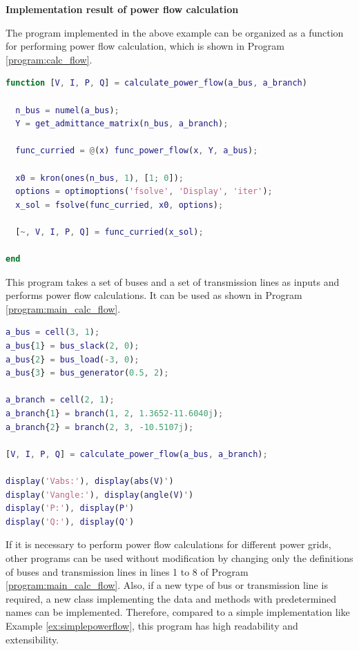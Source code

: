 \documentclass[graybox, envcountchap]{svmult}
\begin{document}
\begin{example}{\textbf{Implementation result of power flow calculation}}

The program implemented in the above example can be organized as a function for
performing power flow calculation, which is shown in Program
\ref{program:calc_flow}.

\begin{lstlisting}[language=Matlab, caption=calculate\_power\_flow.m, label={program:calc_flow}]
function [V, I, P, Q] = calculate_power_flow(a_bus, a_branch)

  n_bus = numel(a_bus);
  Y = get_admittance_matrix(n_bus, a_branch);

  func_curried = @(x) func_power_flow(x, Y, a_bus);

  x0 = kron(ones(n_bus, 1), [1; 0]);
  options = optimoptions('fsolve', 'Display', 'iter');
  x_sol = fsolve(func_curried, x0, options);

  [~, V, I, P, Q] = func_curried(x_sol);

end
\end{lstlisting}

This program takes a set of buses and a set of transmission lines as inputs and
performs power flow calculations. It can be used as shown in Program
\ref{program:main_calc_flow}.

\begin{lstlisting}[language=Matlab, caption=main\_power\_flow.m, label={program:main_calc_flow}]
a_bus = cell(3, 1);
a_bus{1} = bus_slack(2, 0);
a_bus{2} = bus_load(-3, 0);
a_bus{3} = bus_generator(0.5, 2);

a_branch = cell(2, 1);
a_branch{1} = branch(1, 2, 1.3652-11.6040j);
a_branch{2} = branch(2, 3, -10.5107j);

[V, I, P, Q] = calculate_power_flow(a_bus, a_branch);

display('Vabs:'), display(abs(V)')
display('Vangle:'), display(angle(V)')
display('P:'), display(P')
display('Q:'), display(Q')
\end{lstlisting}

If it is necessary to perform power flow calculations for different power grids,
other programs can be used without modification by changing only the definitions
of buses and transmission lines in lines 1 to 8 of Program
\ref{program:main_calc_flow}. Also, if a new type of bus or transmission line is
required, a new class implementing the data and methods with predetermined names
can be implemented. Therefore, compared to a simple implementation like Example
\ref{ex:simplepowerflow}, this program has high readability and extensibility.
\end{example}
\end{document}
